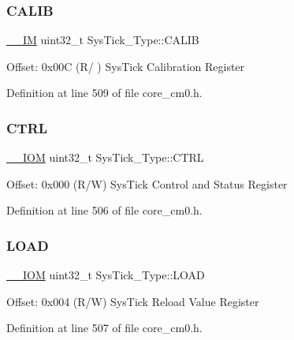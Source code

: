 \subsubsection{\texorpdfstring{C\+A\+L\+IB}{CALIB}}
{\footnotesize\ttfamily \hyperlink{core__sc300_8h_a4cc1649793116d7c2d8afce7a4ffce43}{\+\_\+\+\_\+\+IM} uint32\+\_\+t Sys\+Tick\+\_\+\+Type\+::\+C\+A\+L\+IB}

Offset\+: 0x00C (R/ ) Sys\+Tick Calibration Register 

Definition at line 509 of file core\+\_\+cm0.\+h.

\mbox{\label{struct_sys_tick___type_a875e7afa5c4fd43997fb544a4ac6e37e}} 
\subsubsection{\texorpdfstring{C\+T\+RL}{CTRL}}
{\footnotesize\ttfamily \hyperlink{core__sc300_8h_ab6caba5853a60a17e8e04499b52bf691}{\+\_\+\+\_\+\+I\+OM} uint32\+\_\+t Sys\+Tick\+\_\+\+Type\+::\+C\+T\+RL}

Offset\+: 0x000 (R/W) Sys\+Tick Control and Status Register 

Definition at line 506 of file core\+\_\+cm0.\+h.

\mbox{\label{struct_sys_tick___type_a4780a489256bb9f54d0ba8ed4de191cd}} 
\subsubsection{\texorpdfstring{L\+O\+AD}{LOAD}}
{\footnotesize\ttfamily \hyperlink{core__sc300_8h_ab6caba5853a60a17e8e04499b52bf691}{\+\_\+\+\_\+\+I\+OM} uint32\+\_\+t Sys\+Tick\+\_\+\+Type\+::\+L\+O\+AD}

Offset\+: 0x004 (R/W) Sys\+Tick Reload Value Register 

Definition at line 507 of file core\+\_\+cm0.\+h.

\mbox{\label{struct_sys_tick___type_a9b5420d17e8e43104ddd4ae5a610af93}} 
